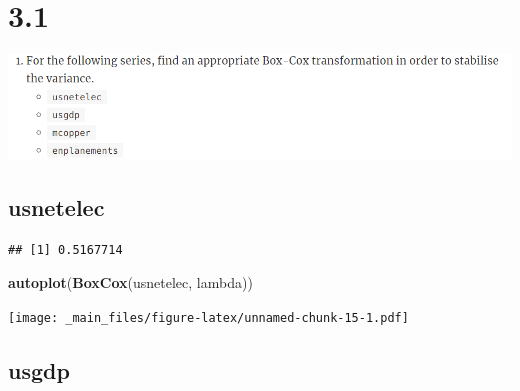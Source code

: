 \documentclass[]{book}
\newenvironment{Shaded}{\begin{snugshade}}{\end{snugshade}}
\newcommand{\KeywordTok}[1]{\textcolor[rgb]{0.13,0.29,0.53}{\textbf{#1}}}
\newcommand{\NormalTok}[1]{#1}
\newcommand{\OperatorTok}[1]{\textcolor[rgb]{0.81,0.36,0.00}{\textbf{#1}}}
\newcommand{\StringTok}[1]{\textcolor[rgb]{0.31,0.60,0.02}{#1}}
\begin{document}
\hypertarget{section-3}{%
\section{3.1}\label{section-3}}

\includegraphics{./week1/3.1.png}

\hypertarget{usnetelec}{%
\subsection{usnetelec}\label{usnetelec}}

\begin{Shaded}
\end{Shaded}

\begin{verbatim}
## [1] 0.5167714
\end{verbatim}

\begin{Shaded}
\begin{Highlighting}[]
\KeywordTok{autoplot}\NormalTok{(}\KeywordTok{BoxCox}\NormalTok{(usnetelec, lambda))}
\end{Highlighting}
\end{Shaded}

\texttt{[image: \_main\_files/figure-latex/unnamed-chunk-15-1.pdf]}

\hypertarget{usgdp}{%
\subsection{usgdp}\label{usgdp}}

\begin{Shaded}
\end{Shaded}
\end{document}
